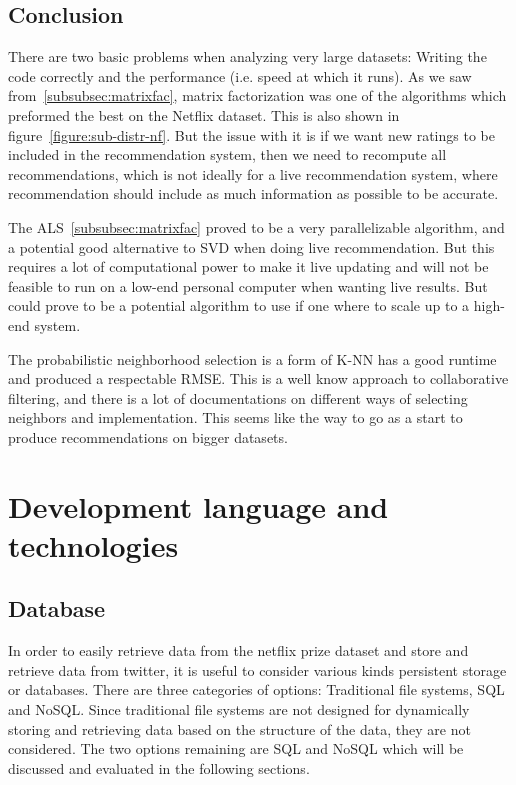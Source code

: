 \subsection{Conclusion}\label{subsec:sim-sys-conc}
There are two basic problems when analyzing very large datasets: Writing the code correctly and the performance (i.e. speed at which it runs). As we saw from~\ref{subsubsec:matrixfac}, matrix factorization was one of the algorithms which preformed the best on the Netflix dataset. This is also shown in figure~\ref{figure:sub-distr-nf}. But the issue with it is if we want new ratings to be included in the recommendation system, then we need to recompute all recommendations, which is not ideally for a live recommendation system, where recommendation should include as much information as possible to be accurate.

The ALS~\ref{subsubsec:matrixfac} proved to be a very parallelizable algorithm, and a potential good alternative to SVD when doing live recommendation. But this requires a lot of computational power to make it live updating and will not be feasible to run on a low-end personal computer when wanting live results. But could prove to be a potential algorithm to use if one where to scale up to a high-end system.

The probabilistic neighborhood selection is a form of K-NN has a good runtime and produced a respectable RMSE. This is a well know approach to collaborative filtering, and there is a lot of documentations on different ways of selecting neighbors and implementation. This seems like the way to go as a start to produce recommendations on bigger datasets.



\section{Development language and technologies}

\subsection{Database}
In order to easily retrieve data from the netflix prize dataset and store and retrieve data from twitter, it is useful to consider various kinds persistent storage or databases. There are three categories of options: Traditional file systems, SQL and NoSQL. Since traditional file systems are not designed for dynamically storing and retrieving data based on the structure of the data, they are not considered. The two options remaining are SQL and NoSQL which will be discussed and evaluated in the following sections.

